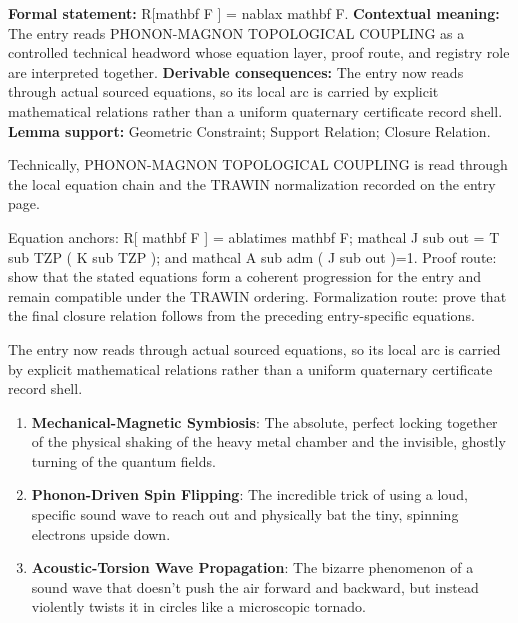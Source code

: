 \begingroup\footnotesize\setlength{\emergencystretch}{3em}\sloppy
\textbf{Formal statement:} R[mathbf F ] = nablax mathbf F. \textbf{Contextual meaning:} The entry reads PHONON-MAGNON TOPOLOGICAL COUPLING as a controlled technical headword whose equation layer, proof route, and registry role are interpreted together. \textbf{Derivable consequences:} The entry now reads through actual sourced equations, so its local arc is carried by explicit mathematical relations rather than a uniform quaternary certificate record shell. \textbf{Lemma support:} Geometric Constraint; Support Relation; Closure Relation.\par
\endgroup

Technically, PHONON-MAGNON TOPOLOGICAL COUPLING is read through the local equation chain and the TRAWIN normalization recorded on the entry page.

Equation anchors: R[ mathbf F ] = ablatimes mathbf F; mathcal J sub out = T sub TZP ( K sub TZP ); and mathcal A sub adm ( J sub out )=1. Proof route: show that the stated equations form a coherent progression for the entry and remain compatible under the TRAWIN ordering. Formalization route: prove that the final closure relation follows from the preceding entry-specific equations.

The entry now reads through actual sourced equations, so its local arc is carried by explicit mathematical relations rather than a uniform quaternary certificate record shell.
\endgroup

\begin{enumerate}[leftmargin=1.6em,itemsep=6pt,topsep=4pt]
\item \textbf{Mechanical-Magnetic Symbiosis}: The absolute, perfect locking together of the physical shaking of the heavy metal chamber and the invisible, ghostly turning of the quantum fields.
\item \textbf{Phonon-Driven Spin Flipping}: The incredible trick of using a loud, specific sound wave to reach out and physically bat the tiny, spinning electrons upside down.
\item \textbf{Acoustic-Torsion Wave Propagation}: The bizarre phenomenon of a sound wave that doesn't push the air forward and backward, but instead violently twists it in circles like a microscopic tornado.
\end{enumerate}

